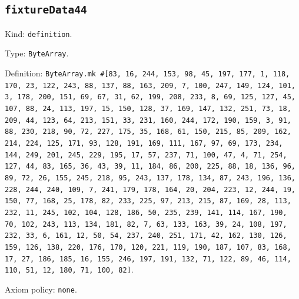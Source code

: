 \documentclass[11pt]{article}
\begin{document}
\subsection*{\texttt{fixtureData44}}
\noindent Kind: \texttt{definition}.\par
\noindent Type: \texttt{ByteArray}.\par
\noindent Definition: \texttt{ByteArray.mk \#[83, 16, 244, 153, 98, 45, 197, 177, 1, 118, 170, 23, 122, 243, 88, 137, 88, 163, 209, 7, 100, 247, 149, 124, 101, 3, 178, 200, 151, 69, 67, 31, 62, 199, 208, 233, 8, 69, 125, 127, 45, 107, 88, 24, 113, 197, 15, 150, 128, 37, 169, 147, 132, 251, 73, 18, 209, 44, 123, 64, 213, 151, 33, 231, 160, 244, 172, 190, 159, 3, 91, 88, 230, 218, 90, 72, 227, 175, 35, 168, 61, 150, 215, 85, 209, 162, 214, 224, 125, 171, 93, 128, 191, 169, 111, 167, 97, 69, 173, 234, 144, 249, 201, 245, 229, 195, 17, 57, 237, 71, 100, 47, 4, 71, 254, 127, 44, 83, 165, 36, 43, 39, 11, 184, 86, 200, 225, 88, 18, 136, 96, 89, 72, 26, 155, 245, 218, 95, 243, 137, 178, 134, 87, 243, 196, 136, 228, 244, 240, 109, 7, 241, 179, 178, 164, 20, 204, 223, 12, 244, 19, 150, 77, 168, 25, 178, 82, 233, 225, 97, 213, 215, 87, 169, 28, 113, 232, 11, 245, 102, 104, 128, 186, 50, 235, 239, 141, 114, 167, 190, 70, 102, 243, 113, 134, 181, 82, 7, 63, 133, 163, 39, 24, 108, 197, 232, 33, 6, 161, 12, 50, 54, 237, 240, 251, 171, 42, 162, 130, 126, 159, 126, 138, 220, 176, 170, 120, 221, 119, 190, 187, 107, 83, 168, 17, 27, 186, 185, 16, 155, 246, 197, 191, 132, 71, 122, 89, 46, 114, 110, 51, 12, 180, 71, 100, 82]}.\par
\noindent Axiom policy: \texttt{none}.\par
\end{document}

